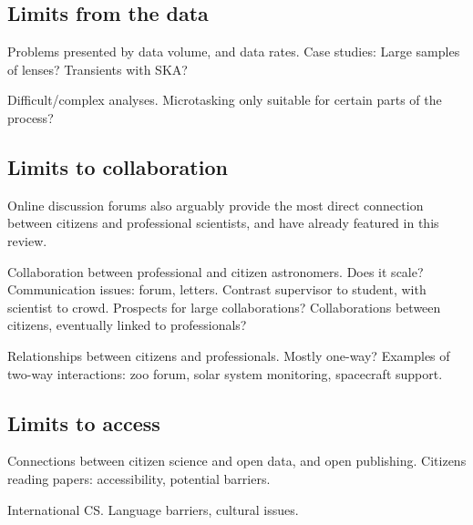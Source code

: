 \documentclass{ar2e}
\begin{document}

\subsection{Limits from the data}
\label{sec:limits:data}

Problems presented by data volume, and data rates. 
Case studies: Large samples of lenses?  Transients with SKA? 

Difficult/complex analyses. Microtasking only suitable for certain parts of the
process?



\subsection{Limits to collaboration}
\label{sec:limits:collab}
Online discussion forums also 
arguably provide the most direct connection between citizens and professional
scientists, and have already featured in this review.  

Collaboration between professional and citizen astronomers. Does it scale?
Communication issues: forum, letters. Contrast supervisor to student, with
scientist to crowd. Prospects for large collaborations? Collaborations between
citizens, eventually linked to professionals?

Relationships between citizens and professionals. Mostly one-way? Examples of
two-way interactions: zoo forum, solar system monitoring, spacecraft support.

% 


\subsection{Limits to access}
\label{sec:limits:access}

Connections between citizen science and open data, and open publishing. 
Citizens reading papers: accessibility, potential barriers. 

International CS. Language barriers, cultural issues. 
\end{document}
